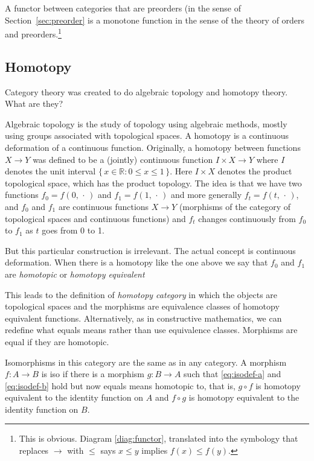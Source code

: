 \documentclass[11pt]{article}
\newcommand{\set}[1]{\{\,#1\,\}}
\newcommand{\real}{\mathbb{R}}
\newcommand{\fatdot}{\,\cdot\,}
\begin{document}
A functor between categories that are preorders (in the sense of
Section~\ref{sec:preorder} is a monotone function in the sense of the
theory of orders and preorders.\footnote{This is obvious.
Diagram \eqref{diag:functor}, translated into the symbology that replaces
$\to$ with $\le$ says $x \le y$ implies $f(x) \le f(y)$.}

\subsection{Homotopy}
\label{sec:homotopy}

Category theory was created \citep{eilenberg-maclane}
to do algebraic topology and homotopy theory.
What are they?

Algebraic topology is the study of topology using algebraic methods,
mostly using groups associated with topological spaces.
A homotopy is a continuous deformation of a continuous function.
Originally, a homotopy between functions $X \to Y$ was defined to be
a (jointly) continuous
function $I \times X \to Y$ where $I$ denotes the unit interval
$\set{x \in \real : 0 \le x \le 1}$.
Here $I \times X$ denotes the product topological space, which has the product
topology.
The idea is that we have two functions $f_0 = f(0, \fatdot)$
and $f_1 = f(1, \fatdot)$
and more generally $f_t = f(t, \fatdot)$, and $f_0$ and $f_1$ are
continuous functions $X \to Y$ (morphisms of the category of topological
spaces and continuous functions) and $f_t$ changes continuously from $f_0$
to $f_1$ as $t$ goes from 0 to 1.

But this particular construction is irrelevant.  The actual concept is
continuous deformation.  When there is a homotopy like the one above we
say that $f_0$ and $f_1$ are \emph{homotopic} or \emph{homotopy equivalent}

This leads to the definition of \emph{homotopy category} in which the
objects are topological spaces and the morphisms are equivalence classes
of homotopy equivalent functions.
Alternatively, as in constructive mathematics, we can redefine what equals
means rather than use equivalence classes.  Morphisms are equal if they
are homotopic.

Isomorphisms in this category are the same as in any category.  A morphism
$f : A \to B$ is iso if there is a morphism $g : B \to A$ such that
\eqref{eq:isodef-a} and \eqref{eq:isodef-b} hold but now equals means
homotopic to, that is, $g \circ f$ is homotopy equivalent to the identity
function on $A$ and $f \circ g$ is homotopy equivalent to the identity
function on $B$.
\end{document}
